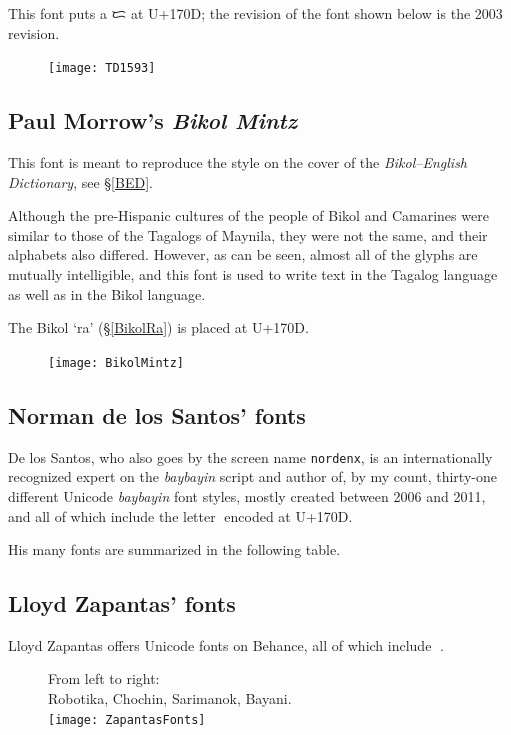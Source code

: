 \documentclass[a4paper,pagesize,openany,14pt,parskip=never]{scrbook}
\newcommand{\≈}{$\approx$}
\newcommand{\ra}{{\baybayin ᜍ}}
\begin{document}
This font puts a {\baybayin ᜇ} at U+170D; the revision of the font shown below is the 2003 revision.

\begin{figure}[H]
\texttt{[image: TD1593]}
\end{figure}

\subsection{Paul Morrow's {\em Bikol Mintz}}

This font is meant to reproduce the style on the cover of the {\em Bikol--English Dictionary}, see \S\ref{BED}.

Although the pre-Hispanic cultures of the people of Bikol and Camarines were similar to those of the Tagalogs of Maynila, they were not the same, and their alphabets also differed. However, as can be seen, almost all of the glyphs are mutually intelligible, and this font is used to write text in the Tagalog language as well as in the Bikol language.

The Bikol `ra' (\S\ref{BikolRa}) is placed at U+170D.

\begin{figure}[H]
\texttt{[image: BikolMintz]}
\end{figure}

\subsection{Norman de los Santos' fonts}
\label{Nordenx}

De los Santos, who also goes by the screen name \texttt{nordenx}, is an internationally recognized expert on the {\em baybayin} script and author of, by my count, thirty-one different Unicode {\em baybayin} font styles, mostly created between 2006 and 2011, and all of which include the letter \ra encoded at U+170D.

His many fonts are summarized in the following table.



\subsection{Lloyd Zapantas' fonts}
\label{Lloyd}

Lloyd Zapantas offers Unicode fonts on Behance, all of which include \ra.

\begin{figure}[H]
    From left to right: \\ 
    Robotika, Chochin, Sarimanok, Bayani. \\
\texttt{[image: ZapantasFonts]}
\end{figure}
\end{document}
